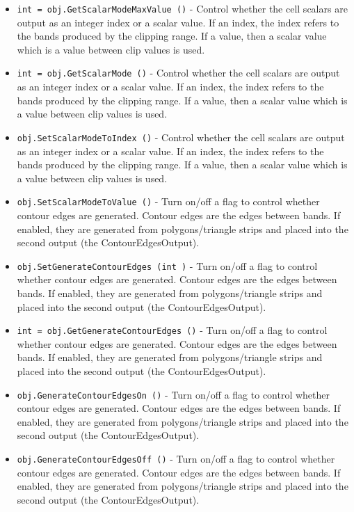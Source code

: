 \begin{itemize}
\item  \verb|int = obj.GetScalarModeMaxValue ()| -  Control whether the cell scalars are output as an integer index or
 a scalar value. If an index, the index refers to the bands produced
 by the clipping range. If a value, then a scalar value which is a 
 value between clip values is used.

\item  \verb|int = obj.GetScalarMode ()| -  Control whether the cell scalars are output as an integer index or
 a scalar value. If an index, the index refers to the bands produced
 by the clipping range. If a value, then a scalar value which is a 
 value between clip values is used.

\item  \verb|obj.SetScalarModeToIndex ()| -  Control whether the cell scalars are output as an integer index or
 a scalar value. If an index, the index refers to the bands produced
 by the clipping range. If a value, then a scalar value which is a 
 value between clip values is used.

\item  \verb|obj.SetScalarModeToValue ()| -  Turn on/off a flag to control whether contour edges are generated.
 Contour edges are the edges between bands. If enabled, they are 
 generated from polygons/triangle strips and placed into the second
 output (the ContourEdgesOutput).

\item  \verb|obj.SetGenerateContourEdges (int )| -  Turn on/off a flag to control whether contour edges are generated.
 Contour edges are the edges between bands. If enabled, they are 
 generated from polygons/triangle strips and placed into the second
 output (the ContourEdgesOutput).

\item  \verb|int = obj.GetGenerateContourEdges ()| -  Turn on/off a flag to control whether contour edges are generated.
 Contour edges are the edges between bands. If enabled, they are 
 generated from polygons/triangle strips and placed into the second
 output (the ContourEdgesOutput).

\item  \verb|obj.GenerateContourEdgesOn ()| -  Turn on/off a flag to control whether contour edges are generated.
 Contour edges are the edges between bands. If enabled, they are 
 generated from polygons/triangle strips and placed into the second
 output (the ContourEdgesOutput).

\item  \verb|obj.GenerateContourEdgesOff ()| -  Turn on/off a flag to control whether contour edges are generated.
 Contour edges are the edges between bands. If enabled, they are 
 generated from polygons/triangle strips and placed into the second
 output (the ContourEdgesOutput).


\end{itemize}
